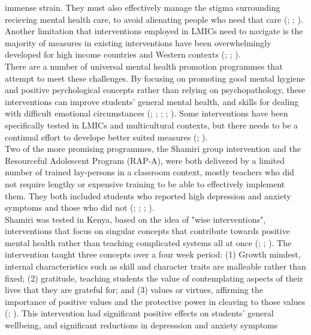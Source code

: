 \documentclass[DIV=calc,fontsize=12bp,a4paper]{scrartcl}
\begin{document}
immense strain. They must also effectively manage the stigma surrounding
recieving mental health care, to avoid alienating people who need that care
(\cite{Osetal20b}; \cite{Osetal20}; \cite{Oseral21}). \\
Another limitation that interventions employed in LMICs need to navigate is the
majority of measures in existing interventions have been overwhelmingly
developed for high income countries and Western contexts (\cite{barryetal13};
\cite{oretal18}; \cite{Osetal20}). \\
There are a number of universal mental health promotion programmes that attempt
to meet these challenges. By focusing on promoting good mental hygiene and
positive psychological concepts rather than relying on psychopathology, these
interventions can improve students' general mental health, and skills for
dealing with difficult emotional circumstances (\cite{barryetal13};
\cite{oretal18}; \cite{Osetal20}; \cite{Oseral21}; \cite{riduvetal11}).
Some interventions have been specifically tested in LMICs and multicultural
contexts, but there needs to be a continual effort to develope better suited
measures (\cite{barryetal13}; \cite{Osetal20}). \\
Two of the more promising programmes, the Shamiri group intervention
and the Resourceful Adolescent Program (RAP-A), were both delivered by
a limited number of trained lay-persons in a classroom context, mostly teachers
who did not require lengthy or expensive training to be able to effectively
implement them. They both included students who reported high depression and
anxiety symptoms and those who did not (\cite{Osetal20b}; \cite{Osetal20};
\cite{Oseral21}; \cite{riduvetal11}). \\
Shamiri was tested in Kenya, based on the idea of "wise interventions",
interventions that focus on singular concepts that contribute towards positive
mental health rather than teaching complicated systems all at once (\cite{Osetal20b};
\cite{Osetal20}; \cite{Oseral21}). The intervention taught three concepts over
a four week period: (1) Growth mindest, internal characteristics
such as skill and character traits are malleable rather than fixed; (2)
gratitude, teaching students the value of contemplating aspects of their lives
that they are grateful for; and (3) values or virtues, affirming the importance
of positive values and the protective power in cleaving to those values (\cite{Osetal20b}; \cite{Oseral21}).
This intervention had significant positive effects on students' general
wellbeing, and significant reductions in depresssion and anxiety symptoms
\end{document}
